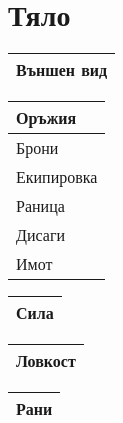 \documentclass{article}
\begin{document}
\section{Тяло}
\extrarowsep=4cm
\noindent
\begin{tabular}{|p{\textwidth}|}
\hline
{\tiny Външен вид}  \\
\hline
\end{tabular}

\begin{multicols}{2}
\extrarowsep=3cm
\noindent
\begin{tabular}{|p{7cm}|}
\hline
{\tiny Оръжия}  \\
\hline
{\tiny Брони}  \\
\hline
{\tiny Екипировка}  \\
\hline
{\tiny Раница}  \\
\hline
{\tiny Дисаги}  \\
\hline
{\tiny Имот}  \\
\hline
\end{tabular}

\extrarowsep=1cm
\begin{tabular}{|p{2cm}|}
\hline
{\tiny Сила}  \\
\hline
\end{tabular}

\extrarowsep=1cm
\begin{tabular}{|p{2cm}|}
\hline
{\tiny Ловкост}  \\
\hline
\end{tabular}

\extrarowsep=4cm
\begin{tabular}{|p{4cm}|}
\hline
{\tiny Рани}  \\
\hline
\end{tabular}


\end{multicols}
\end{document}
